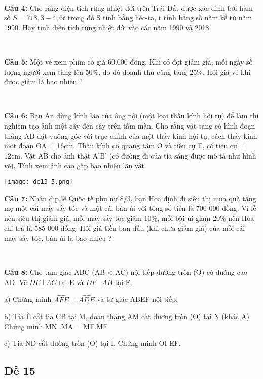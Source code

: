 \documentclass[12pt]{article}
\begin{document}
\    

\textbf{Câu 4:} Cho rằng diện tích rừng nhiệt đới trên Trái Đất được xác định bởi hàm số $S = 718,3 - 4,6t$ trong đó S tính bằng héc-ta, t tính bằng số năm kể từ năm 1990. Hãy tính diện tích rừng nhiệt đới vào các năm 1990 và 2018. \par

\    

\textbf{Câu 5:} Một vé xem phim có giá 60.000 đồng. Khi có đợt giảm giá, mỗi ngày số lượng người xem tăng lên 50\%, do đó doanh thu cũng tăng 25\%. Hỏi giá vé khi được giảm là bao nhiêu ? \par

\    

\textbf{Câu 6:} Bạn An dùng kính lão của ông nội (một loại thấu kính hội tụ) để làm thí nghiệm tạo ảnh một cây đèn cầy trên tấm màn. Cho rằng vật sáng có hình đoạn thẳng AB đặt vuông góc với trục chính của một thấy kính hội tụ, cách thấy kính một đoạn OA = 16cm. Thấu kính có quang tâm O và tiêu cự F, có tiêu cự = 12cm. Vặt AB cho ảnh thật A'B' (có đường đi của tia sáng được mô tả như hình vẽ). Tính xem ảnh cao gấp bao nhiêu lần vật. 

\begin{center}
    \texttt{[image: de13-5.png]}
\end{center} 

\textbf{Câu 7:} Nhận dịp lễ Quốc tế phụ nữ 8/3, bạn Hoa định đi siêu thị mua quà tặng mẹ một cái máy sấy tóc và một cái bàn ủi với tổng số tiền là 700 000 đồng. Vì lễ nên siêu thị giảm giá, mỗi máy sấy tóc giảm 10\%, mỗi bài ủi giảm 20\% nên Hoa chỉ trả là 585 000 đồng. Hỏi giá tiền ban đầu (khi chưa giảm giá) của mỗi cái máy sấy tóc, bàn ủi là bao nhiêu ?

\   

\textbf{Câu 8:} Cho tam giác ABC (AB < AC) nội tiếp đường tròn (O) có đường cao AD. Vẽ $DE \bot AC$ tại E và $DF \bot AB$ tại F. \par
a) Chứng minh $\widehat{AFE} = \widehat{ADE}$ và tứ giác ABEF nội tiếp. \par
b) Tia È cắt tia CB tại M, đoạn thẳng AM cắt đương tròn (O) tại N (khác A). Chứng minh MN .MA = MF.ME \par
c) Tia ND cắt đường tròn (O) tại I. Chứng minh OI \bot EF. \par

\break

\subsection{Đề 15}
\end{document}
